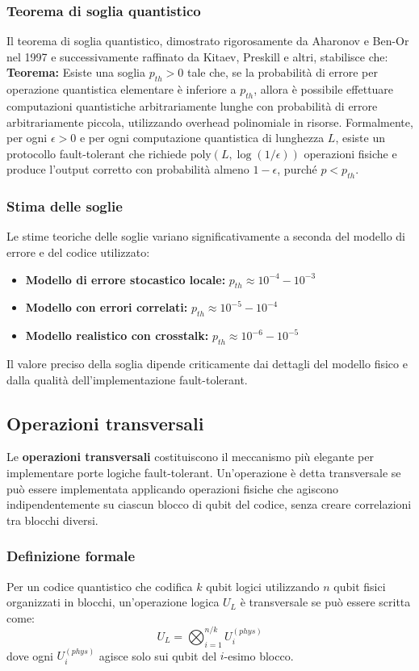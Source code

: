 \documentclass[a4paper,12pt]{report}
\theoremstyle{plain}
\begin{document}
\subsubsection{Teorema di soglia quantistico}
Il teorema di soglia quantistico, dimostrato rigorosamente da Aharonov e Ben-Or nel 1997 e successivamente raffinato da Kitaev, Preskill e altri, stabilisce che:
\textbf{Teorema:} Esiste una soglia $p_{th} > 0$ tale che, se la probabilità di errore per operazione quantistica elementare è inferiore a $p_{th}$, allora è possibile effettuare computazioni quantistiche arbitrariamente lunghe con probabilità di errore arbitrariamente piccola, utilizzando overhead polinomiale in risorse.
Formalmente, per ogni $\epsilon > 0$ e per ogni computazione quantistica di lunghezza $L$, esiste un protocollo fault-tolerant che richiede $\text{poly}(L, \log(1/\epsilon))$ operazioni fisiche e produce l'output corretto con probabilità almeno $1-\epsilon$, purché $p < p_{th}$.
\subsubsection{Stima delle soglie}
Le stime teoriche delle soglie variano significativamente a seconda del modello di errore e del codice utilizzato:
\begin{itemize}
\item \textbf{Modello di errore stocastico locale:} $p_{th} \approx 10^{-4} - 10^{-3}$
\item \textbf{Modello con errori correlati:} $p_{th} \approx 10^{-5} - 10^{-4}$
\item \textbf{Modello realistico con crosstalk:} $p_{th} \approx 10^{-6} - 10^{-5}$
\end{itemize}
Il valore preciso della soglia dipende criticamente dai dettagli del modello fisico e dalla qualità dell'implementazione fault-tolerant.
\subsection{Operazioni transversali}
Le \textbf{operazioni transversali} costituiscono il meccanismo più elegante per implementare porte logiche fault-tolerant. Un'operazione è detta transversale se può essere implementata applicando operazioni fisiche che agiscono indipendentemente su ciascun blocco di qubit del codice, senza creare correlazioni tra blocchi diversi.
\subsubsection{Definizione formale}
Per un codice quantistico che codifica $k$ qubit logici utilizzando $n$ qubit fisici organizzati in blocchi, un'operazione logica $U_L$ è transversale se può essere scritta come:
\[
U_L = \bigotimes_{i=1}^{n/k} U_i^{(phys)}
\]
dove ogni $U_i^{(phys)}$ agisce solo sui qubit del $i$-esimo blocco.
\end{document}
